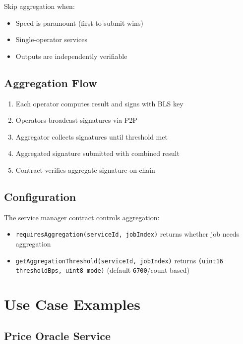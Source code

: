 \documentclass[11pt,a4paper]{article}
\begin{document}
Skip aggregation when:
\begin{itemize}[noitemsep]
    \item Speed is paramount (first-to-submit wins)
    \item Single-operator services
    \item Outputs are independently verifiable
\end{itemize}

\subsection{Aggregation Flow}

\begin{enumerate}[noitemsep]
    \item Each operator computes result and signs with BLS key
    \item Operators broadcast signatures via P2P
    \item Aggregator collects signatures until threshold met
    \item Aggregated signature submitted with combined result
    \item Contract verifies aggregate signature on-chain
\end{enumerate}

\subsection{Configuration}

The service manager contract controls aggregation:
\begin{itemize}[noitemsep]
    \item \texttt{requiresAggregation(serviceId, jobIndex)} returns whether job needs aggregation
    \item \texttt{getAggregationThreshold(serviceId, jobIndex)} returns \texttt{(uint16 thresholdBps, uint8 mode)} (default \texttt{6700}/count-based)
\end{itemize}

\section{Use Case Examples}

\subsection{Price Oracle Service}
\end{document}
